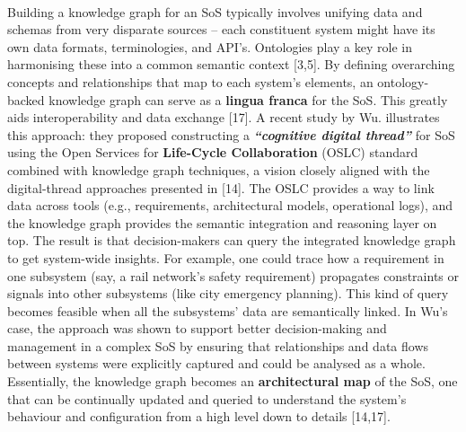         \paragraph{}
        Building a knowledge graph for an SoS typically involves unifying data and schemas from very disparate sources – each constituent system might have its own data formats, terminologies, and API's. Ontologies play a key role in harmonising these into a common semantic context [3,5]. By defining overarching concepts and relationships that map to each system’s elements, an ontology-backed knowledge graph can serve as a \textbf{lingua franca} for the SoS. This greatly aids interoperability and data exchange [17]. A recent study by Wu. illustrates this approach: they proposed constructing a \textit{\textbf{“cognitive digital thread”}} for SoS using the Open Services for \textbf{Life-Cycle Collaboration} (OSLC) standard combined with knowledge graph techniques, a vision closely aligned with the digital-thread approaches presented in [14]. The OSLC provides a way to link data across tools (e.g., requirements, architectural models, operational logs), and the knowledge graph provides the semantic integration and reasoning layer on top. The result is that decision-makers can query the integrated knowledge graph to get system-wide insights. For example, one could trace how a requirement in one subsystem (say, a rail network’s safety requirement) propagates constraints or signals into other subsystems (like city emergency planning). This kind of query becomes feasible when all the subsystems’ data are semantically linked. In Wu's case, the approach was shown to support better decision-making and management in a complex SoS by ensuring that relationships and data flows between systems were explicitly captured and could be analysed as a whole. Essentially, the knowledge graph becomes an \textbf{architectural map} of the SoS, one that can be continually updated and queried to understand the system’s behaviour and configuration from a high level down to details [14,17].
        

